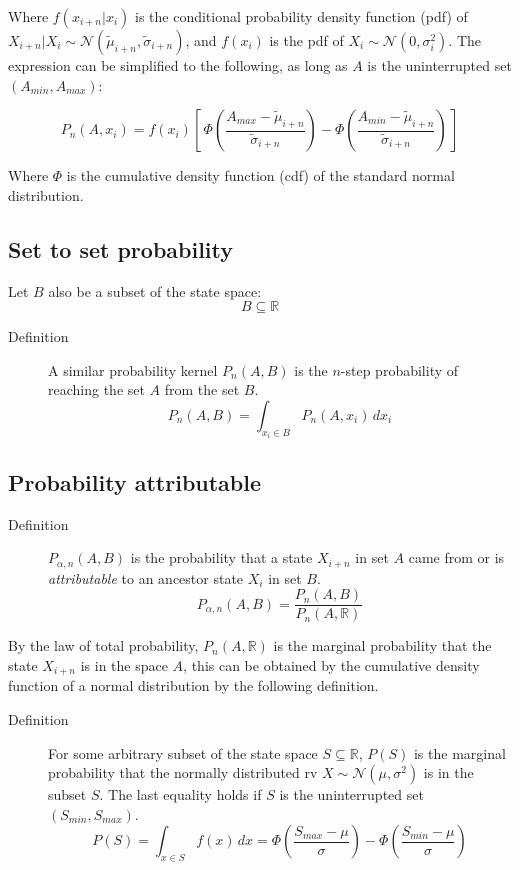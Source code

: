 \documentclass[letterpaper,10pt]{article} %
\begin{document}
Where $f(x_{i+n}|x_i)$ is the conditional probability density function (pdf) of $X_{i+n}|X_i \sim \mathcal{N}( \tilde{\mu}_{i+n}, \tilde{\sigma}_{i+n})$, and $f(x_i)$ is the pdf of $X_i \sim \mathcal{N}(0, \sigma_i^2)$.
The expression can be simplified to the following, as long as $A$ is the uninterrupted set $(A_{min}, A_{max})$:

$$P_n(A, x_i) = f(x_i)[\, \Phi(\frac{A_{max}- \tilde{\mu}_{i+n}}{\tilde{\sigma}_{i+n}}) - \Phi(\frac{A_{min}- \tilde{\mu}_{i+n}}{\tilde{\sigma}_{i+n}}) \, ]$$

Where $\Phi$ is the cumulative density function (cdf) of the standard normal distribution. 


\subsection{Set to set probability}
Let $B$ also be a subset of the state space:
%
$$B \subseteq \mathbb{R}$$

\begin{description}
\item [Definition] A similar probability kernel $P_n(A, B)$ is the $n$-step probability of reaching the set $A$ from the set $B$. 
$$P_n(A, B) = \int_{x_i\in B}^{} P_n(A, x_i) \, dx_i$$
\end{description}




\subsection{Probability attributable}

\begin{description}
\item [Definition] $P_{\alpha , n}(A, B)$ is the probability that a state $X_{i+n}$ in set $A$ came from or is \emph{attributable} to an ancestor state $X_i$ in set $B$.
$$P_{\alpha , n}(A, B) = \frac{P_n(A, B)}{P_n(A, \mathbb{R})}$$
\end{description}

By the law of total probability, $P_n(A, \mathbb{R})$ is the marginal probability that the state $X_{i+n}$ is in the space $A$, this can be obtained by the cumulative density function of a normal distribution by the following definition.

\begin{description}
\item [Definition] For some arbitrary subset of the state space $S \subseteq \mathbb{R}$, $P(S)$ is the marginal probability that the normally distributed rv $X \sim \mathcal{N}(\mu, \sigma^2)$ is in the subset $S$. The last equality holds if $S$ is the uninterrupted set $(S_{min}, S_{max})$.
$$P(S) = \int_{x\in S} f(x) \, dx = \Phi(\frac{S_{max} - \mu}{\sigma}) - \Phi(\frac{S_{min} - \mu}{\sigma})$$
\end{description}
\end{document}
